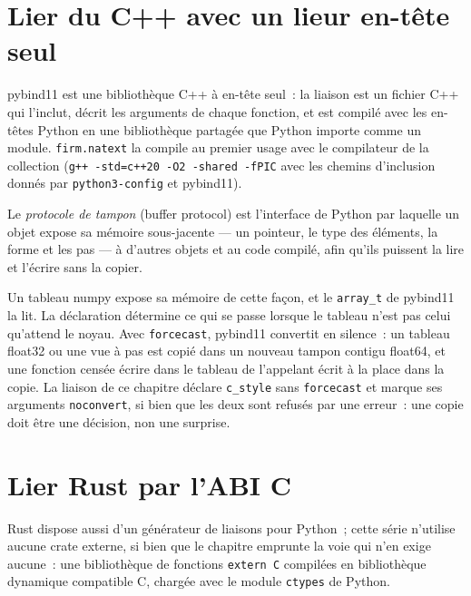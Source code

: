 \section{Lier du C++ avec un lieur en-tête seul}

pybind11 est une bibliothèque C++ à en-tête seul~: la liaison est un fichier C++ qui l'inclut, décrit les arguments de chaque fonction, et est compilé
avec les en-têtes Python en une bibliothèque partagée que Python importe comme un module. \texttt{firm.natext} la compile au premier usage avec le
compilateur de la collection (\texttt{g++ -std=c++20 -O2 -shared -fPIC} avec les chemins d'inclusion donnés par \texttt{python3-config} et
pybind11).

\label{lst:pl:native-extensions:pybind}

\begin{definition}\label{def:pl:native-extensions:buffer}
Le \emph{protocole de tampon} (buffer protocol) est l'interface de Python par laquelle un objet expose sa mémoire sous-jacente --- un pointeur,
le type des éléments, la forme et les pas --- à d'autres objets et au code compilé, afin qu'ils puissent la lire et l'écrire sans
la copier.
\end{definition}

Un tableau numpy expose sa mémoire de cette façon, et le \texttt{array\_t} de pybind11 la lit. La déclaration détermine ce qui se passe lorsque
le tableau n'est pas celui qu'attend le noyau. Avec \texttt{forcecast}, pybind11 convertit en silence~: un tableau float32 ou une vue à pas est copié
dans un nouveau tampon contigu float64, et une fonction censée écrire dans le tableau de l'appelant écrit à la place dans la copie. La
liaison de ce chapitre déclare \texttt{c\_style} sans \texttt{forcecast} et marque ses arguments \texttt{noconvert}, si bien que les deux sont refusés
par une erreur~: une copie doit être une décision, non une surprise.

\section{Lier Rust par l'ABI C}

Rust dispose aussi d'un générateur de liaisons pour Python~; cette série n'utilise aucune crate externe, si bien que le chapitre emprunte la voie qui n'en exige aucune~: une
bibliothèque de fonctions \texttt{extern \textquotedbl{}C\textquotedbl{}} compilées en bibliothèque dynamique compatible C, chargée avec le module \texttt{ctypes} de Python.

